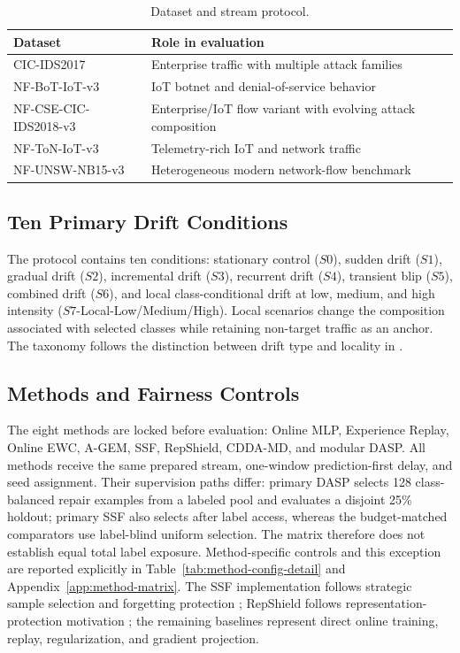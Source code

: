 \documentclass{ieeeaccess}
\begin{document}
\begin{table}[t]
\caption{Dataset and stream protocol.}
\label{tab:datasets}
\centering
\begin{tabular}{p{}p{}}
\toprule
Dataset & Role in evaluation\\
\midrule
CIC-IDS2017 & Enterprise traffic with multiple attack families\\
NF-BoT-IoT-v3 & IoT botnet and denial-of-service behavior\\
NF-CSE-CIC-IDS2018-v3 & Enterprise/IoT flow variant with evolving attack composition\\
NF-ToN-IoT-v3 & Telemetry-rich IoT and network traffic\\
NF-UNSW-NB15-v3 & Heterogeneous modern network-flow benchmark\\
\bottomrule
\end{tabular}
\end{table}

\subsection{Ten Primary Drift Conditions}
The protocol contains ten conditions: stationary control ($S0$), sudden drift ($S1$), gradual drift ($S2$), incremental drift ($S3$), recurrent drift ($S4$), transient blip ($S5$), combined drift ($S6$), and local class-conditional drift at low, medium, and high intensity ($S7$-Local-Low/Medium/High). Local scenarios change the composition associated with selected classes while retaining non-target traffic as an anchor. The taxonomy follows the distinction between drift type and locality in \cite{Arora2024DriftReview,Li2024DriftType,Aguiar2024Locality}.

\subsection{Methods and Fairness Controls}
The eight methods are locked before evaluation: Online MLP, Experience Replay, Online EWC, A-GEM, SSF, RepShield, CDDA-MD, and modular DASP. All methods receive the same prepared stream, one-window prediction-first delay, and seed assignment. Their supervision paths differ: primary DASP selects 128 class-balanced repair examples from a labeled pool and evaluates a disjoint 25\% holdout; primary SSF also selects after label access, whereas the budget-matched comparators use label-blind uniform selection. The matrix therefore does not establish equal total label exposure. Method-specific controls and this exception are reported explicitly in Table~\ref{tab:method-config-detail} and Appendix~\ref{app:method-matrix}. The SSF implementation follows strategic sample selection and forgetting protection \cite{Zhang2025SSF}; RepShield follows representation-protection motivation \cite{Liu2026RepShield}; the remaining baselines represent direct online training, replay, regularization, and gradient projection.
\end{document}
